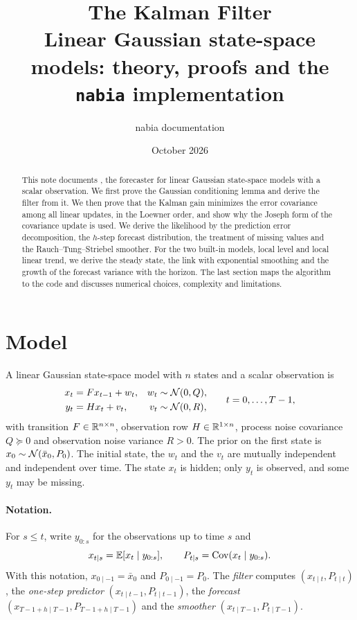 \documentclass[11pt,a4paper]{article}
\title{The Kalman Filter\\[0.3em]\large Linear Gaussian state-space models: theory, proofs and the \texttt{nabia} implementation}
\author{nabia documentation}
\date{October 2026}
\begin{document}
\maketitle

\begin{abstract}
This note documents , the  forecaster for linear
Gaussian state-space models with a scalar observation. We first prove the Gaussian
conditioning lemma and derive the filter from it. We then prove that the Kalman gain
minimizes the error covariance among all linear updates, in the Loewner order, and
show why the Joseph form of the covariance update is used. We derive the
likelihood by the prediction error decomposition, the $h$-step forecast
distribution, the treatment of missing values and the Rauch--Tung--Striebel
smoother. For the two built-in models, local level and local linear trend, we
derive the steady state, the link with exponential smoothing and the growth of
the forecast variance with the horizon. The last section maps the algorithm to
the code and discusses numerical choices, complexity and limitations.
\end{abstract}

\tableofcontents

\section{Model}

A linear Gaussian state-space model with $n$ states and a scalar observation is
\begin{equation}\label{eq:model}
\begin{aligned}
  x_t &= F x_{t-1} + w_t, & w_t &\sim \mathcal{N}(0, Q),\\
  y_t &= H x_t + v_t,     & v_t &\sim \mathcal{N}(0, R),
\end{aligned}
\qquad t = 0,\dots,T-1,
\end{equation}
with transition $F\in\mathbb{R}^{n\times n}$, observation row $H\in\mathbb{R}^{1\times n}$,
process noise covariance $Q\succeq0$ and observation noise variance $R>0$. The
prior on the first state is $x_0\sim\mathcal{N}(\bar x_0, P_0)$. The initial state, the
$w_t$ and the $v_t$ are mutually independent and independent over time. The state
$x_t$ is hidden; only $y_t$ is observed, and some $y_t$ may be missing.

\paragraph{Notation.} For $s\le t$, write $y_{0:s}$ for the observations up
to time $s$ and
\[
  x_{t\mid s} = \mathbb{E}[x_t\mid y_{0:s}],\qquad P_{t\mid s} = \operatorname{Cov}(x_t\mid y_{0:s}).
\]
With this notation, $x_{0\mid -1}=\bar x_0$ and $P_{0\mid -1}=P_0$. The \emph{filter} computes
$(x_{t\mid t},P_{t\mid t})$, the \emph{one-step predictor} $(x_{t\mid t-1},P_{t\mid t-1})$,
the \emph{forecast} $(x_{T-1+h\mid T-1},P_{T-1+h\mid T-1})$ and the \emph{smoother}
$(x_{t\mid T-1},P_{t\mid T-1})$.
\end{document}
